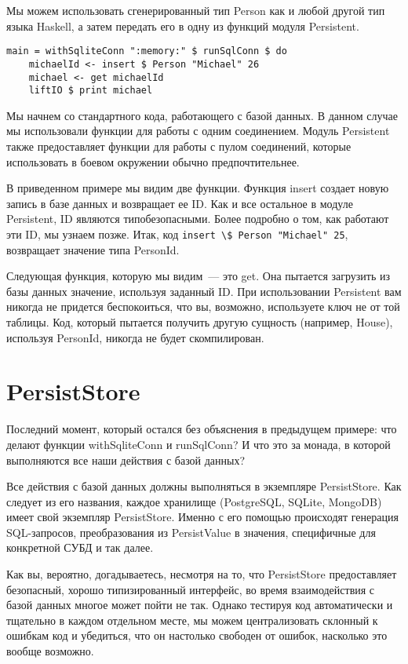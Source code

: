 Мы можем использовать сгенерированный тип Person как и любой другой тип языка Haskell, а затем передать его в одну из функций модуля Persistent.

\begin{lstlisting}
main = withSqliteConn ":memory:" $ runSqlConn $ do
    michaelId <- insert $ Person "Michael" 26
    michael <- get michaelId
    liftIO $ print michael
\end{lstlisting}%

Мы начнем со стандартного кода, работающего с базой данных. В данном случае мы использовали функции для работы с одним соединением. Модуль Persistent также предоставляет функции для работы с пулом соединений, которые использовать в боевом окружении обычно предпочтительнее.

В приведенном примере мы видим две функции. Функция insert создает новую запись в базе данных и возвращает ее ID. Как и все остальное в модуле Persistent, ID являются типобезопасными. Более подробно о том, как работают эти ID, мы узнаем позже. Итак, код \lstinline'insert \$ Person "Michael" 25', возвращает значение типа PersonId.

Следующая функция, которую мы видим~--- это get. Она пытается загрузить из базы данных значение, используя заданный ID. При использовании Persistent вам никогда не придется беспокоиться, что вы, возможно, используете ключ не от той таблицы. Код, который пытается получить другую сущность (например, House), используя PersonId, никогда не будет скомпилирован.

\section{PersistStore}

Последний момент, который остался без объяснения в предыдущем примере: что делают функции withSqliteConn и runSqlConn? И что это за монада, в которой выполняются все наши действия с базой данных?

Все действия с базой данных должны выполняться в экземпляре PersistStore. Как следует из его названия, каждое хранилище (PostgreSQL, SQLite, MongoDB) имеет свой экземпляр PersistStore. Именно с его помощью происходят генерация SQL-запросов, преобразования из PersistValue в значения, специфичные для конкретной СУБД и так далее.

\begin{remark}
Как вы, вероятно, догадываетесь, несмотря на то, что PersistStore предоставляет безопасный, хорошо типизированный интерфейс, во время взаимодействия с базой данных многое может пойти не так. Однако тестируя код автоматически и тщательно в каждом отдельном месте, мы можем централизовать склонный к ошибкам код и убедиться, что он настолько свободен от ошибок, насколько это вообще возможно.
\end{remark}

